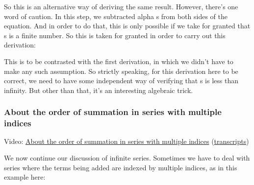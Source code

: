 \documentclass[pdftex, brazil, 12pt, twoside]{article}
\begin{document}
So this is an alternative way of deriving the same result.
However, there's one word of caution.
In this step, we subtracted alpha s from both
sides of the equation.
And in order to do that, this is only possible if we take
for granted that s is a finite number.
So this is taken for granted in order to carry out this
derivation:

\begin{figure}[H]
  \begin{center}
  \end{center}
\end{figure}

This is to be contrasted with the first derivation, in which
we didn't have to make any such assumption.
So strictly speaking, for this derivation here to be correct,
we need to have some independent way of verifying
that s is less than infinity.
But other than that, it's an interesting algebraic trick.

\subsubsection{About the order of summation in series with multiple indices}
\label{un1-math-order-summation}

Video: \href{https://www.youtube.com/watch?v=CASxP2Pldmk}{About the order of summation in series with multiple indices}
(\href{Unit-1/02\_mathematical\_background/mb\_8\_transcripts.pdf}{transcripts})

We now continue our discussion of infinite series.
Sometimes we have to deal with series where the terms being
added are indexed by multiple indices, as in
this example here:

\begin{figure}[H]
  \begin{center}
  \end{center}
\end{figure}
\end{document}
